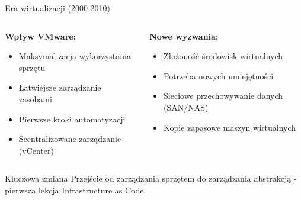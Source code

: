 \documentclass[10pt, aspectratio=169]{beamer}
\begin{document}
\begin{frame}{Era wirtualizacji (2000-2010)}
\begin{columns}[T]
\begin{column}{0.5\textwidth}
\textbf{Wpływ VMware:}
\begin{itemize}
\item Maksymalizacja wykorzystania sprzętu
\item Łatwiejsze zarządzanie zasobami  
\item Pierwsze kroki automatyzacji
\item Scentralizowane zarządzanie (vCenter)
\end{itemize}
\end{column}
\begin{column}{0.5\textwidth}
\textbf{Nowe wyzwania:}
\begin{itemize}
\item Złożoność środowisk wirtualnych
\item Potrzeba nowych umiejętności
\item Sieciowe przechowywanie danych (SAN/NAS)
\item Kopie zapasowe maszyn wirtualnych
\end{itemize}
\end{column}
\end{columns}

\begin{block}{Kluczowa zmiana}
Przejście od zarządzania sprzętem do zarządzania abstrakcją - pierwsza lekcja Infrastructure as Code
\end{block}
\end{frame}
\end{document}
